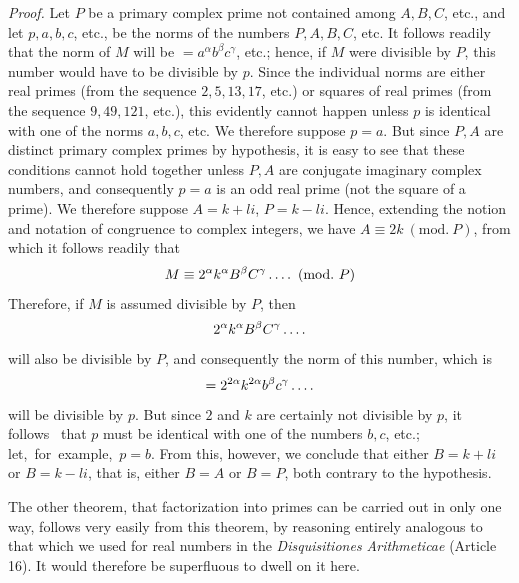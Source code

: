 \emph{Proof.} Let $P$ be a primary complex prime not contained among $A,B,C$, etc., and let $p,a,b,c$, etc., be the norms of the numbers $P,A,B,C$, etc. It follows readily that the norm of $M$ will be $=a^\alpha b^\beta c^\gamma$, etc.; hence, if $M$ were divisible by $P$, this number would have to be divisible by $p$. Since the individual norms are either real primes (from the sequence $2,5,13,17$, etc.) or squares of real primes (from the sequence $9,49,121$, etc.), this evidently cannot happen unless $p$ is identical with one of the norms $a,b,c$, etc. We therefore suppose $p=a$. But since $P,A$ are distinct primary complex primes by hypothesis, it is easy to see that these conditions cannot hold together unless $P,A$ are conjugate imaginary complex numbers, and consequently $p=a$ is an odd real prime (not the square of a prime). We therefore suppose $A=k+li$, $P=k-li$. Hence, extending the notion and notation of congruence to complex integers, we have $A\equiv2k\ (\mathrm{mod.}\ P)$, from which it follows readily that
\[
M\equiv2^\alpha k^\alpha B^\beta C^\gamma\mathinner{.\,.\,.\,.}\ (\mathrm{mod.}\ P)
\]
Therefore, if $M$ is assumed divisible by $P$, then
\[
2^\alpha k^\alpha B^\beta C^\gamma\mathinner{.\,.\,.\,.}
\]
will also be divisible by $P$, and consequently the norm of this number, which is
\[
=2^{2\alpha}k^{2\alpha}b^\beta c^\gamma\mathinner{.\,.\,.\,.}
\]
will be divisible by $p$. But since $2$ and $k$ are certainly not divisible by $p$, it follows\ %
that $p$ must be identical with one of the numbers $b,c$, etc.; \mbox{let, for example, $p=b$.} From this, however, we conclude that either $B=k+li$ or $B=k-li$, that is, either $B=A$ or $B=P$, both contrary to the hypothesis.

The other theorem, that factorization into primes can be carried out in only one way, follows very easily from this theorem, by reasoning entirely analogous to that which we used for real numbers in the \emph{Disquisitiones Arithmeticae} (Article 16). It would therefore be superfluous to dwell on it here.

